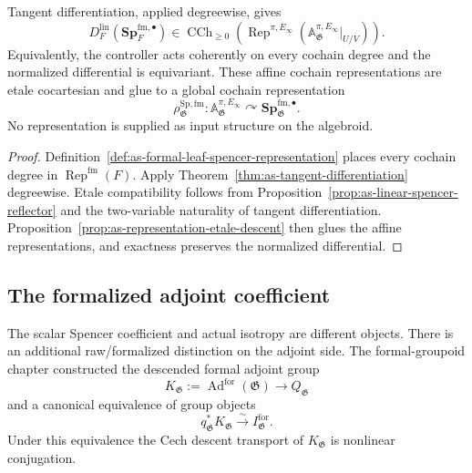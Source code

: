 \begin{theorem}
\label{thm:as-universal-spencer-representation}
Tangent differentiation, applied degreewise, gives
\[
\boxed{
    D_F^{\mathrm{lin}}
    \left(
        \mathbf{Sp}_F^{\mathrm{fm},\bullet}
    \right)
    \in
    \operatorname{CCh}_{\geq0}
    \left(
        \operatorname{Rep}^{\pi,E_\infty}
        \left(
            \mathbb A_{\mathfrak G}^{\pi,E_\infty}|_{U/V}
        \right)
    \right).
}
\]
Equivalently, the controller acts coherently on every cochain degree and the
normalized differential is equivariant.  These affine cochain
representations are etale cocartesian and glue to a global cochain
representation
\[
\boxed{
    \rho_{\mathfrak G}^{\mathrm{Sp,fm}}:
    \mathbb A_{\mathfrak G}^{\pi,E_\infty}
    \curvearrowright
    \mathbf{Sp}_{\mathfrak G}^{\mathrm{fm},\bullet}.
}
\]
No representation is supplied as input structure on the algebroid.
\end{theorem}

\begin{proof}
Definition~\ref{def:as-formal-leaf-spencer-representation} places every
cochain degree in $\operatorname{Rep}^{\mathrm{fm}}(F)$.  Apply
Theorem~\ref{thm:as-tangent-differentiation} degreewise.  Etale compatibility
follows from Proposition~\ref{prop:as-linear-spencer-reflector} and the
two-variable naturality of tangent differentiation.
Proposition~\ref{prop:as-representation-etale-descent} then glues the affine
representations, and exactness preserves the normalized differential.
\end{proof}

\subsection{The formalized adjoint coefficient}

The scalar Spencer coefficient and actual isotropy are different objects.
There is an additional raw/formalized distinction on the adjoint side.  The
formal-groupoid chapter constructed the descended formal adjoint group
\[
\boxed{
    K_{\mathfrak G}
    :=
    \operatorname{Ad}^{\mathrm{for}}(\mathfrak G)
    \longrightarrow
    Q_{\mathfrak G}
}
\]
and a canonical equivalence of group objects
\[
    q_{\mathfrak G}^*K_{\mathfrak G}
    \xrightarrow{\sim}
    I_{\mathfrak G}^{\mathrm{for}}.
\]
Under this equivalence the Cech descent transport of $K_{\mathfrak G}$ is
nonlinear conjugation.

